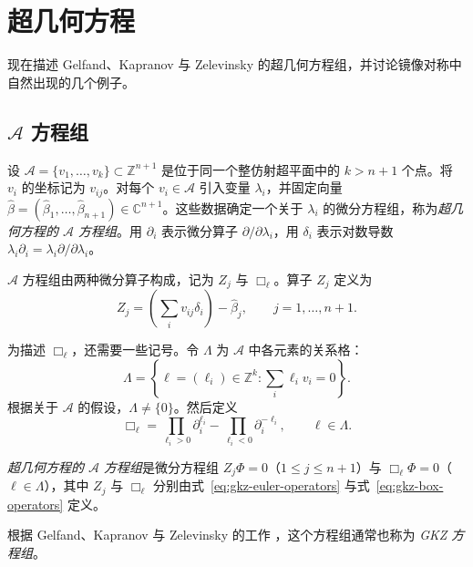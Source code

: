 \section{超几何方程}\label{sec:hypergeometric}

现在描述 Gelfand、Kapranov 与 Zelevinsky 的超几何方程组，并讨论镜像对称中自然出现的几个例子。

\subsection{$\mathcal A$ 方程组}\label{subsec:a-system}

设 $\mathcal A=\{v_1,\ldots,v_k\}\subset\mathbb Z^{n+1}$ 是位于同一个整仿射超平面中的 $k>n+1$ 个点。将 $v_i$ 的坐标记为 $v_{ij}$。对每个 $v_i\in\mathcal A$ 引入变量 $\lambda_i$，并固定向量
$\widehat\beta=(\widehat\beta_1,\ldots,\widehat\beta_{n+1})\in\mathbb C^{n+1}$。这些数据确定一个关于 $\lambda_i$ 的微分方程组，称为\emph{超几何方程的 $\mathcal A$ 方程组}。用 $\partial_i$ 表示微分算子 $\partial/\partial\lambda_i$，用 $\delta_i$ 表示对数导数 $\lambda_i\partial_i=\lambda_i\partial/\partial\lambda_i$。

$\mathcal A$ 方程组由两种微分算子构成，记为 $Z_j$ 与 $\Box_\ell$。算子 $Z_j$ 定义为
\begin{equation}\label{eq:gkz-euler-operators}
Z_j=\left(\sum_i v_{ij}\delta_i\right)-\widehat\beta_j,
\qquad j=1,\ldots,n+1.
\end{equation}

为描述 $\Box_\ell$，还需要一些记号。令 $\Lambda$ 为 $\mathcal A$ 中各元素的关系格：
\begin{equation}\label{eq:gkz-relation-lattice}
\Lambda=\left\{\ell=(\ell_i)\in\mathbb Z^k:\sum_i\ell_iv_i=0\right\}.
\end{equation}
根据关于 $\mathcal A$ 的假设，$\Lambda\ne\{0\}$。然后定义
\begin{equation}\label{eq:gkz-box-operators}
\Box_\ell=\prod_{\ell_i>0}\partial_i^{\ell_i}
-\prod_{\ell_i<0}\partial_i^{-\ell_i},\qquad\ell\in\Lambda.
\end{equation}

\begin{definition}\label{def:gkz-system}
\emph{超几何方程的 $\mathcal A$ 方程组}是微分方程组
$Z_j\Phi=0$（$1\leq j\leq n+1$）与 $\Box_\ell\Phi=0$（$\ell\in\Lambda$），其中 $Z_j$ 与 $\Box_\ell$ 分别由式~\eqref{eq:gkz-euler-operators} 与式~\eqref{eq:gkz-box-operators} 定义。
\end{definition}
根据 Gelfand、Kapranov 与 Zelevinsky 的工作 ，这个方程组通常也称为 \emph{GKZ 方程组}。

